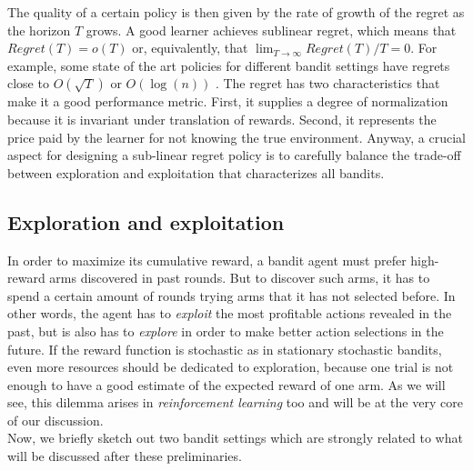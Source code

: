 The quality of a certain policy is then given by the rate of growth of the regret as the horizon $T$ grows. A good learner achieves sublinear regret, which means that $Regret(T) = o(T)$ or, equivalently, that $\lim_{T\to\infty}Regret(T)/T = 0$. For example, some state of the art policies for different bandit settings have regrets close to $O(\sqrt{T})$ or $O(\log(n))$ \cite{lattimore2019bandit}. The regret has two characteristics that make it a good performance metric. First, it supplies a degree of normalization because it is invariant under translation of rewards. Second, it represents the price paid by the learner for not knowing the true environment. Anyway, a crucial aspect for designing a sub-linear regret policy is to carefully balance the trade-off between exploration and exploitation that characterizes all bandits.

\subsection{Exploration and exploitation}
In order to maximize its cumulative reward, a bandit agent must prefer high-reward arms discovered in past rounds. But to discover such arms, it has to spend a certain amount of rounds trying arms that it has not selected before. In other words, the agent has to \emph{exploit} the most profitable actions revealed in the past, but is also has to \emph{explore} in order to make better action selections in the future. If the reward function is stochastic as in stationary stochastic bandits, even more resources should be dedicated to exploration, because one trial is not enough to have a good estimate of the expected reward of one arm. As we will see, this dilemma arises in \emph{reinforcement learning} too and will be at the very core of our discussion. \\ Now, we briefly sketch out two bandit settings which are strongly related to what will be discussed after these preliminaries.

